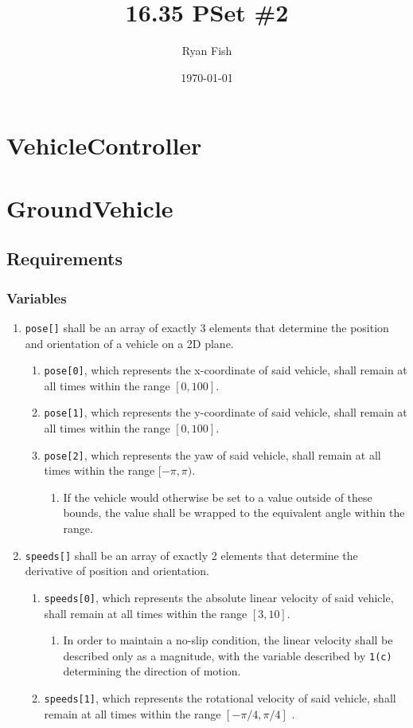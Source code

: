 \documentclass{article}
\title{16.35 PSet \#2}
\author{Ryan Fish}
\date{\today}
\begin{document}
\maketitle

\section{VehicleController}
\section{GroundVehicle}
\subsection{Requirements}
\subsubsection{Variables}
\begin{enumerate}
	\item \verb|pose[]| shall be an array of exactly 3 elements that determine the position and orientation of a vehicle on a 2D plane.
	\begin{enumerate}
		\item \verb|pose[0]|, which represents the x-coordinate of said vehicle, shall remain at all times within the range $[0,100]$.
		\item \verb|pose[1]|, which represents the y-coordinate of said vehicle, shall remain at all times within the range $[0,100]$.
		\item \verb|pose[2]|, which represents the yaw of said vehicle, shall remain at all times within the range $[-\pi, \pi)$.
		\begin{enumerate}
			\item If the vehicle would otherwise be set to a value outside of these bounds, the value shall be wrapped to the equivalent angle within the range.
		\end{enumerate}
	\end{enumerate}
	\item \verb|speeds[]| shall be an array of exactly 2 elements that determine the derivative of position and orientation.
	\begin{enumerate}
		\item \verb|speeds[0]|, which represents the absolute linear velocity of said vehicle, shall remain at all times within the range $[3,10]$.
		\begin{enumerate}
			\item In order to maintain a no-slip condition, the linear velocity shall be described only as a magnitude, with the variable described by \verb|1(c)| determining the direction of motion.
		\end{enumerate}
		\item \verb|speeds[1]|, which represents the rotational velocity of said vehicle, shall remain at all times within the range $[-\pi/4,\pi/4]$ .
	\end{enumerate}
\end{enumerate}
\end{document}
